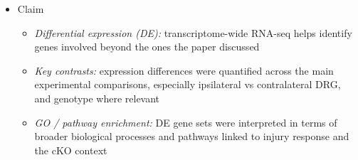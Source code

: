 \documentclass[12pt]{article}
\begin{document}
\begin{itemize}
\begin{itemize}
\item \textcolor{samcolor}{Explore and confirm suggested pathways}
\begin{itemize}
\item \textcolor{samcolor}{FF / cre}
\end{itemize}
\item \textcolor{samcolor}{Examine gene expression changes beyond the genes emphasized in the original paper}
\end{itemize}
\item \textcolor{pitercolor}{Claim}
\begin{itemize}
\item \textcolor{pitercolor}{\textit{Differential expression (DE):} transcriptome-wide RNA-seq helps identify genes involved beyond the ones the paper discussed}
\item \textcolor{pitercolor}{\textit{Key contrasts:} expression differences were quantified across the main experimental comparisons, especially ipsilateral vs contralateral DRG, and genotype where relevant}
\item \textcolor{pitercolor}{\textit{GO / pathway enrichment:} DE gene sets were interpreted in terms of broader biological processes and pathways linked to injury response and the cKO context}
\end{itemize}
\end{itemize}
\end{document}
